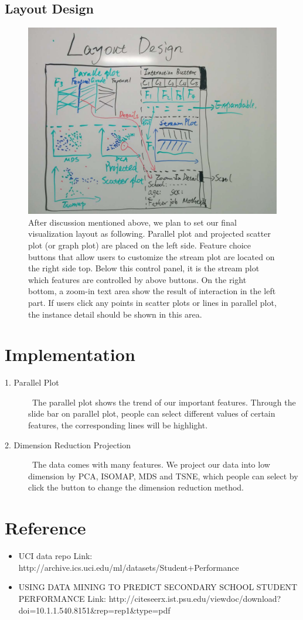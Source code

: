 \documentclass{article}
\begin{document}
\subsection{Layout Design}
\begin{figure}[H]
\centering
\includegraphics[scale=0.23]{layout_design.jpg}
\caption{After discussion mentioned above, we plan to set our final visualization layout as following.  Parallel plot and projected scatter plot (or graph plot) are placed on the left side. Feature choice buttons that allow users to customize the stream plot are located on the right side top. Below this control panel, it is the stream plot which features are controlled by above buttons. On the right bottom, a zoom-in text area show the result  of interaction in the left part. If users click any points in scatter plots or lines in parallel plot, the instance detail should be shown in this area.}
\end{figure}
\section{Implementation}
\begin{description}
\item [1. Parallel Plot]  \
The parallel plot shows the trend of our important features. Through the slide bar on parallel plot, people can select different values of certain features, the corresponding lines will be highlight.
\item [2. Dimension Reduction Projection]  \
The data comes with many features. We project our data into low dimension by PCA, ISOMAP, MDS and TSNE, which people can select by click the button to change the dimension reduction method.
\end{description}
\section{Reference}
\begin{itemize}
\item UCI data repo Link: {http://archive.ics.uci.edu/ml/datasets/Student+Performance}
\item  USING DATA MINING TO PREDICT SECONDARY SCHOOL STUDENT PERFORMANCE Link: {http://citeseerx.ist.psu.edu/viewdoc/download?doi=10.1.1.540.8151&rep=rep1&type=pdf}
\end{itemize}
\end{document}
